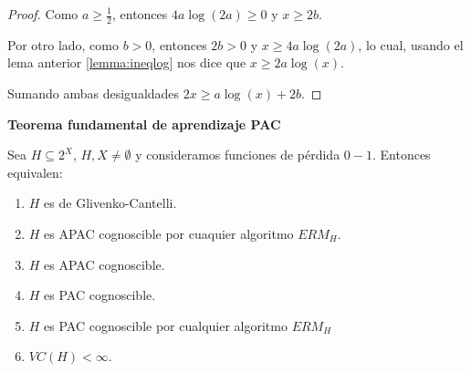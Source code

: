 \begin{proof}
 Como $a \ge \frac{1}{2}$, entonces $4a \log(2a) \ge 0$ y $x \ge 2b$.
 
 Por otro lado, como $b > 0$, entonces $2b > 0$ y $x \ge 4a \log(2a)$, lo cual, usando el lema anterior \ref{lemma:ineqlog} 
 nos dice que $x \ge 2a \log(x)$.
 
 Sumando ambas desigualdades $2x \ge a \log(x) + 2b$.
\end{proof}


\begin{theorem}
\textbf{Teorema fundamental de aprendizaje PAC}

Sea $H\subseteq 2^X$, $H,X \neq \emptyset$ y consideramos funciones de pérdida $0-1$. Entonces equivalen:

\begin{enumerate}[i]
\item \label{th:fundi} $H$ es de Glivenko-Cantelli.
\item \label{th:fundii} $H$ es APAC cognoscible por cuaquier algoritmo $ERM_H$.
\item \label{th:fundiii} $H$ es APAC cognoscible.
\item \label{th:fundiv} $H$ es PAC cognoscible.
\item \label{th:fundv} $H$ es PAC cognoscible por cualquier algoritmo $ERM_H$
\item \label{th:fundvi} $VC (H) < \infty$.
\end{enumerate}
\end{theorem}

